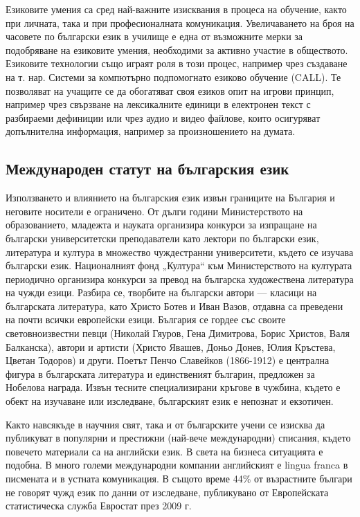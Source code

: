 \documentclass[]{../../metanetpaper}
\begin{document}
\begin{multicols}{2}
Езиковите умения са сред най-важните изисквания в процеса на обучение, както при личната, така и при професионалната комуникация. Увеличаването на броя
 на часовете по български език в училище е една от
 възможните мерки за подобряване на езиковите умения, необходими за активно участие в
 обществото. Езиковите технологии също играят роля в
 този процес, например чрез създаване на т. нар. Системи
 за компютърно подпомогнато езиково обучение (CALL).
 Те позволяват на учащите се да обогатяват своя езиков
 опит на игрови принцип, например чрез свързване на
 лексикалните единици в електронен текст с разбираеми
 дефиниции или
 чрез аудио и видео файлове, които
 осигуряват допълнителна информация, например за произношението на думата. 

\subsection{Международен статут на българския език}

Използването и влиянието на българския език извън границите на България и неговите носители е ограничено. От дълги години Министерството на образованието, младежта и науката организира конкурси за изпращане на български университетски преподаватели като лектори по български език, литература и култура в множество чуждестранни университети, където се изучава български език. Националният фонд „Култура“ към Министерството на културата периодично организира конкурси за превод на българска художествена литература на чужди езици. Разбира се, творбите на български автори — класици на българската литература, като Христо Ботев и Иван Вазов, отдавна са преведени на почти всички европейски езици. 
България се гордее със своите световноизвестни певци (Николай Гяуров,
 Гена Димитрова, Борис Христов, Валя Балканска), автори и артисти (Христо Явашев, Доньо Донев, Юлия Кръстева, Цветан Тодоров) и други. Поетът Пенчо Славейков (1866-1912) е централна фигура в българската литература и единственият българин, предложен за Нобелова награда. Извън тесните специализирани кръгове в чужбина, където е обект на изучаване или изследване, българският език е непознат и екзотичен. 


Както навсякъде в научния свят, така и от българските учени се изисква да публикуват в популярни и престижни (най-вече международни) списания, където повечето материали са на английски език. В света на бизнеса ситуацията е подобна. В много големи международни компании английският е lingua franca в писмената и в устната комуникация. В същото време 44\% от възрастните българи не говорят чужд език по данни от изследване, публикувано от Европейската статистическа служба Евростат \cite{epp} през 2009 г.


\end{multicols}
\end{document}
